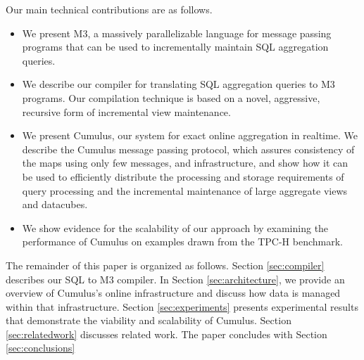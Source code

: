 Our main technical contributions are as follows.
\begin{itemize}
\item
We present M3, a massively parallelizable language
for message passing programs that can be used to incrementally maintain
SQL aggregation queries.

\item
We describe our compiler for translating SQL aggregation queries to M3
programs. Our compilation technique is based on a novel, aggressive, recursive
form of incremental view maintenance.

\item
We present Cumulus, our system for exact online aggregation in realtime.
We describe the Cumulus message passing protocol, which assures
consistency of the maps using only few messages, and
infrastructure, and show how it can be used to efficiently distribute the
processing and storage requirements of query processing and
the incremental maintenance of large aggregate views and datacubes.

\item We show evidence for the scalability of our approach by examining the
performance of Cumulus on examples drawn from the TPC-H\cite{tpch2008}
benchmark. 
\end{itemize}


The remainder of this paper is organized as follows.
Section \ref{sec:compiler} describes our SQL to M3 compiler.
In Section \ref{sec:architecture}, we provide an overview of Cumulus's online
infrastructure and discuss how data is managed within that infrastructure.
Section \ref{sec:experiments} presents
experimental results that demonstrate the viability and scalability of
Cumulus.
Section \ref{sec:relatedwork} discusses related work.
The paper concludes with Section \ref{sec:conclusions}




